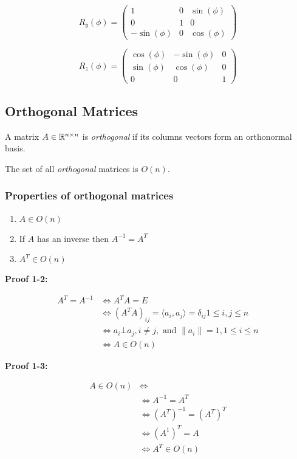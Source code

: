 \[
    R_y (\phi) =
    \begin{pmatrix}
        1 & 0 & \sin(\phi) \\
        0 & 1 & 0 \\
        -\sin(\phi) & 0 & \cos(\phi)
    \end{pmatrix}
\]

\[
    R_z (\phi) =
    \begin{pmatrix}
        \cos(\phi) & -\sin(\phi) & 0 \\
        \sin(\phi) & \cos(\phi) & 0 \\
        0 & 0 & 1
    \end{pmatrix}
\]

\subsection{Orthogonal Matrices}

A matrix \(A \in \mathbb{R}^{n \times n}\) is \emph{orthogonal} if its columns vectors form an orthonormal 
basis.

The set of all \emph{orthogonal} matrices is \(O(n)\).

\subsubsection{Properties of orthogonal matrices}

\begin{enumerate}
    \item \(A \in O(n)\)
    \item If \(A\) has an inverse then \(A^{-1} = A^T\)
    \item \(A^T \in O(n)\)
\end{enumerate}

\textbf{Proof 1-2:}

\begin{align*}
    A^T = A^{-1} &\iff A^T A = E\\
                 &\iff (A^T A)_{ij} = \langle a_i, a_j\rangle = \delta_{ij} 1 \le i,j \le n\\
                 &\iff a_i \bot a_j, i \ne j, \text{ and } \|a_i\| = 1, 1 \le i \le n\\
                 &\iff A \in O(n)
\end{align*}

\textbf{Proof 1-3:}

\begin{align*}
    A \in O(n) &\iff \\
               &\iff A^{-1} = A^T\\
               &\iff (A^T)^{-1} = (A^T)^T \\
               &\iff (A^{1})^{T} = A\\
               &\iff A^T \in O(n)
\end{align*}

